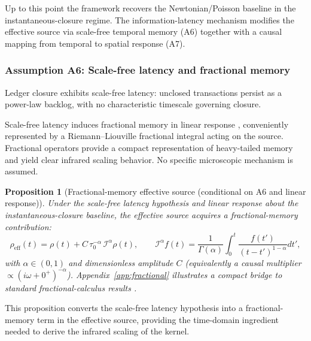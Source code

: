 \documentclass[entropy,article,submit,pdftex,moreauthors]{Definitions/mdpi}
\newtheorem{propositionX}[theoremX]{Proposition}
\begin{document}
Up to this point the framework recovers the Newtonian/Poisson baseline in the instantaneous-closure regime. The information-latency mechanism modifies the effective source via scale-free temporal memory (A6) together with a causal mapping from temporal to spatial response (A7).

\subsubsection{Assumption A6: Scale-free latency and fractional memory}
\label{subsec:a6}

\begin{description}[labelwidth=3.8cm,leftmargin=4.0cm,itemsep=1pt]
  \item[Assumption A6 (Scale-Free Latency).]
  Ledger closure exhibits scale-free latency: unclosed transactions persist as a power-law backlog, with no characteristic timescale governing closure.
\end{description}

Scale-free latency induces fractional memory in linear response \cite{MetzlerKlafter2000,Mainardi2010}, conveniently represented by a Riemann--Liouville fractional integral acting on the source. Fractional operators provide a compact representation of heavy-tailed memory and yield clear infrared scaling behavior. No specific microscopic mechanism is assumed.

\begin{propositionX}[Fractional-memory effective source (conditional on A6 and linear response)]
\label{dr:fractional}
Under the scale-free latency hypothesis and linear response about the instantaneous-closure baseline, the effective source acquires a fractional-memory contribution:
\begin{equation}
  \rho_{\mathrm{eff}}(t)
  =
  \rho(t)
  + C\,\tau_0^{-\alpha}\,\mathcal{I}^{\alpha}\rho(t),
  \qquad
  \mathcal{I}^{\alpha}f(t)=\frac{1}{\Gamma(\alpha)}\int_0^t\frac{f(t')}{(t-t')^{1-\alpha}}dt',
  \label{eq:rhoeff_fractional}
\end{equation}
with \(\alpha\in(0,1)\) and dimensionless amplitude \(C\) (equivalently a causal multiplier \(\propto(i\omega+0^+)^{-\alpha}\)). Appendix~\ref{app:fractional} illustrates a compact bridge to standard fractional-calculus results \cite{MetzlerKlafter2000,Mainardi2010}.
\end{propositionX}
This proposition converts the scale-free latency hypothesis into a fractional-memory term in the effective source, providing the time-domain ingredient needed to derive the infrared scaling of the kernel.
\end{document}
